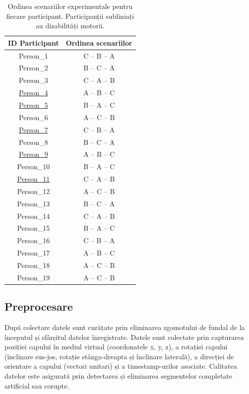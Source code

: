 \documentclass[12pt,a4paper]{report}
\theoremstyle{definition}
\theoremstyle{remark}
\begin{document}
\begin{table}[H]
\centering
\caption{Ordinea scenariilor experimentale pentru fiecare participant. Participanții subliniați au dizabilități motorii.}
\label{tab:scenario_order}
\begin{tabular}{@{}cc@{}}
\toprule
\textbf{ID Participant} & \textbf{Ordinea scenariilor} \\ 
\midrule
Person\_1           & C – B – A         \\
Person\_2           & B – C – A         \\
Person\_3           & C – A – B         \\
\underline{Person\_4}           & A – B – C         \\
\underline{Person\_5}           & B – A – C         \\
Person\_6           & A – C – B         \\
\underline{Person\_7}           & C – B – A         \\
Person\_8           & B – C – A         \\
\underline{Person\_9}           & A – B – C         \\
Person\_10           & B – A – C         \\
\underline{Person\_11}           & C – A – B         \\
Person\_12           & A – C – B         \\
Person\_13           & B – C – A         \\
Person\_14           & C – A – B         \\
Person\_15           & B – A – C         \\
Person\_16           & C – B – A         \\
Person\_17           & A – B – C         \\
Person\_18           & A – C – B         \\
Person\_19           & A – C – B         \\ 
\bottomrule
\end{tabular}
\end{table}

\subsection{Preprocesare}

După colectare datele sunt curățate prin eliminarea zgomotului de fundal de la începutul și sfârșitul datelor înregistrate. Datele sunt colectate prin capturarea poziției capului în mediul virtual (coordonatele x, y, z), a rotației capului (înclinare sus-jos, rotație stânga-dreapta și înclinare laterală), a direcției de orientare a capului (vectori unitari) și a timestamp-urilor asociate. Calitatea datelor este asigurată prin detectarea și eliminarea segmentelor completate artificial sau corupte.
\end{document}
